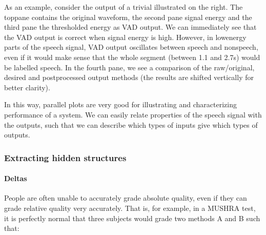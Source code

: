 \documentclass[letterpaper,10pt,english]{jupyterBook}
\begin{document}
\sphinxAtStartPar
As an example, consider the output of a trivial  illustrated on the right. The
top\sphinxhyphen{}pane contains the original waveform, the second pane signal energy
and the third pane the thresholded energy as VAD output. We can
immediately see that the VAD output is correct when signal energy is
high. However, in low\sphinxhyphen{}energy parts of the speech signal, VAD output
oscillates between speech and non\sphinxhyphen{}speech, even if it would make sense
that the whole segment (between 1.1 and 2.7s) would be labelled speech.
In the fourth pane, we see a comparison of the raw/original, desired and
post\sphinxhyphen{}processed output methods (the results are shifted vertically for
better clarity).

\sphinxAtStartPar
In this way, parallel plots are very good for illustrating and
characterizing performance of a system. We can easily relate properties
of the speech signal with the outputs, such that we can describe which
types of inputs give which types of outputs.

\sphinxAtStartPar
{}


\subsubsection{Extracting hidden structures}
\label{\detokenize{Evaluation/Analysis_of_evaluation_results:extracting-hidden-structures}}

\paragraph{Deltas}
\label{\detokenize{Evaluation/Analysis_of_evaluation_results:deltas}}
\sphinxAtStartPar
People are often unable to accurately grade absolute quality, even if
they can grade relative quality very accurately. That is, for example,
in a MUSHRA test, it is perfectly normal that three subjects would grade
two methods A and B such that:
\end{document}
